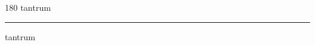 
\begin{frame}
\begin{center}
\begin{turn}{180}
{\fontsize{2.5cm}{1em}\selectfont tantrum}
\end{turn}
\vspace{1em}\par  
\hrule
\vspace{1em}\par  
{\fontsize{2.5cm}{1em}\selectfont tantrum}
\end{center}
\end{frame}
